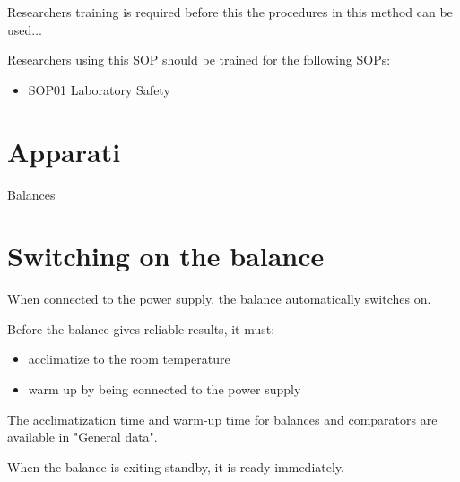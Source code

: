 \documentclass[12pt]{../SOP4_alpha}\usepackage[]{graphicx}\usepackage[]{xcolor}
\begin{document}
\NP Researchers training is required before this the procedures in this method can be used... 

\NP Researchers using this SOP should be trained for the following SOPs:

\begin{itemize}
  \item SOP01 Laboratory Safety
\end{itemize} 

\section{Apparati}

\NP Balances 

\section{Switching on the balance}

\NP When connected to the power supply, the balance automatically switches on.

\NP Before the balance gives reliable results, it must:
\begin{itemize}
\item acclimatize to the room temperature
\item warm up by being connected to the power supply
\end{itemize}
The acclimatization time and warm-up time for balances and comparators are available in "General data".

\NP When the balance is exiting standby, it is ready immediately.
\end{document}
